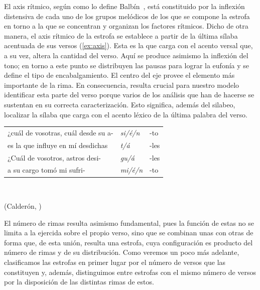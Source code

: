 El axis rítmico, según como lo define Balbín~\parencite*[38-60]{balbin1968}, está constituido por la inflexión distensiva de cada uno de los grupos melódicos de los que se compone la estrofa en torno a la que se concentran y organizan los factores rítmicos.  Dicho de otra manera, el axis rítmico de la estrofa se establece a partir de la última sílaba acentuada de sus versos (\ref{ex:axis}). Esta es la que carga con el acento versal que, a su vez, altera la cantidad del verso. Aquí se produce asimismo la inflexión del tono; en torno a este punto se distribuyen las pausas para lograr la eufonía y se define el tipo de encabalgamiento.  El centro del eje provee el elemento más importante de la rima. En consecuencia, resulta crucial para nuestro modelo identificar esta parte del verso porque varios de los análisis que han de hacerse se sustentan en su correcta caracterización. Esto significa, además del silabeo, localizar la sílaba que carga con el acento léxico de la última palabra del verso.

\begin{exe}
	\ex\label{ex:axis}
		\begin{tabular}{l|l|l}
			\cline{2-2}
			¿cuál de vosotras, cuál desde su a-&\textit{si/é/n} & -to\\
			es la que influye en mí desdichas&	\textit{t/á}	& -les\\
			¿Cuál de vosotros, astros desi-&	\textit{gu/á}	& -les\\
		a su cargo tomó mi sufri-&				\textit{mi/é/n} & -to\\\cline{2-2}
		\end{tabular}\\
	\strut\hfill(Calderón, )
\end{exe}

El número de rimas resulta asimismo fundamental, pues la función de estas no se limita a la ejercida sobre el propio verso, sino que se combinan unas con otras de forma que, de esta unión, resulta una estrofa, cuya configuración es producto del número de rimas y de su distribución. Como veremos un poco más adelante, clasificamos las estrofas en primer lugar por el número de versos que las constituyen y, además, distinguimos entre estrofas con el mismo número de versos por la disposición de las distintas rimas de estos.

